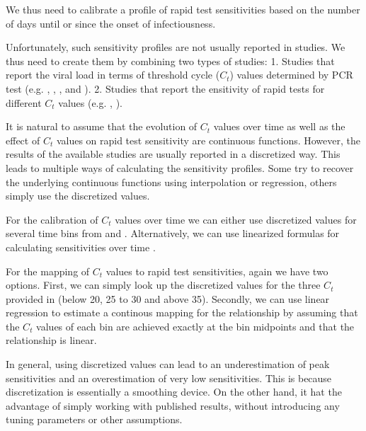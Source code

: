 We thus need to calibrate a profile of rapid test sensitivities based on the
number of days until or since the onset of infectiousness.

Unfortunately, such sensitivity profiles are not usually reported in studies. We
thus need to create them by combining two types of studies: 1. Studies that
report the viral load in terms of threshold cycle ($C_t$) values determined by
PCR test (e.g. \cite{Cosentino2022}, \cite{Ong2021}, \cite{Bonnet2022},
\cite{Jang2021} and \cite{Zuin2021}). 2. Studies that report the ensitivity of
rapid tests for different $C_t$ values (e.g. \cite{Scheiblauer2021},
\cite{Bruemmer2021}).


It is natural to assume that the evolution of $C_t$ values over time as well as
the effect of $C_t$ values on rapid test sensitivity are continuous functions.
However, the results of the available studies are usually reported in a
discretized way. This leads to multiple ways of calculating the sensitivity
profiles. Some try to recover the underlying continuous functions using
interpolation or regression, others simply use the discretized values.

For the calibration of $C_t$ values over time we can either use discretized
values for several time bins from \cite{Ong2021} and \cite{Jang2021}.
Alternatively, we can use linearized formulas for calculating sensitivities over
time \cite{Cosentino2022}.

For the mapping of $C_t$ values to rapid test sensitivities, again we have two
options. First, we can simply look up the discretized values for the three $C_t$
provided in \cite{Scheiblauer2021} (below 20, 25 to 30 and above 35). Secondly,
we can use linear regression to estimate a continous mapping for the
relationship by assuming that the $C_t$ values of each bin are achieved exactly
at the bin midpoints and that the relationship is linear.

In general, using discretized values can lead to an underestimation of peak
sensitivities and an overestimation of very low sensitivities. This is because
discretization is essentially a smoothing device. On the other hand, it hat the
advantage of simply working with published results, without introducing any
tuning parameters or other assumptions.


